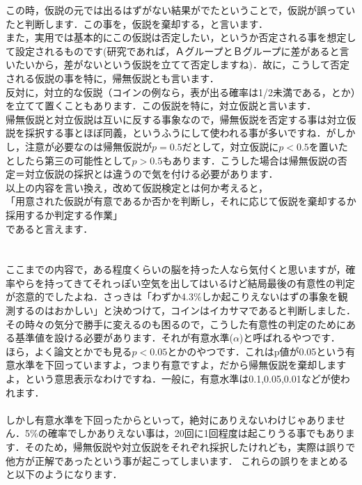 \documentclass[11pt,a4paper,uplatex]{ujreport} 	%
\begin{document}
この時，仮説の元では出るはずがない結果がでたということで，仮説が誤っていたと判断します．この事を，仮説を棄却する，と言います．\\

また，実用では基本的にこの仮説は否定したい，というか否定される事を想定して設定されるものです(研究であれば，ＡグループとＢグループに差があると言いたいから，差がないという仮説を立てて否定しますね)．故に，こうして否定される仮説の事を特に，帰無仮説とも言います．\\

反対に，対立的な仮説（コインの例なら，表が出る確率は1/2未満である，とか）を立てて置くこともあります．この仮説を特に，対立仮説と言います．\\

帰無仮説と対立仮説は互いに反する事象なので，帰無仮説を否定する事は対立仮説を採択する事とほぼ同義，というふうにして使われる事が多いですね．がしかし，注意が必要なのは帰無仮説が$p=0.5$だとして，対立仮説に$p<0.5$を置いたとしたら第三の可能性として$p>0.5$もあります．こうした場合は帰無仮説の否定＝対立仮説の採択とは違うので気を付ける必要があります．\\


以上の内容を言い換え，改めて仮説検定とは何か考えると，\\
「用意された仮説が有意であるか否かを判断し，それに応じて仮説を棄却するか採用するか判定する作業」\\
であると言えます．\\
\\
\\

ここまでの内容で，ある程度くらいの脳を持った人なら気付くと思いますが，確率やらを持ってきてそれっぽい空気を出してはいるけど結局最後の有意性の判定が恣意的でしたよね．さっきは「わずか4.3\%しか起こりえないはずの事象を観測するのはおかしい」と決めつけて，コインはイカサマであると判断しました．\\

その時々の気分で勝手に変えるのも困るので，こうした有意性の判定のためにある基準値を設ける必要があります．それが有意水準($\alpha$)と呼ばれるやつです．\\

ほら，よく論文とかでも見る$p<0.05$とかのやつです．これはp値が0.05という有意水準を下回っていますよ，つまり有意ですよ，だから帰無仮説を棄却しますよ，という意思表示なわけですね．一般に，有意水準は0.1,0.05,0.01などが使われます．\\
\\

しかし有意水準を下回ったからといって，絶対にありえないわけじゃありません．5\%の確率でしかありえない事は，20回に1回程度は起こりうる事でもあります．そのため，帰無仮説や対立仮説をそれぞれ採択したけれども，実際は誤りで他方が正解であったという事が起こってしまいます．
これらの誤りをまとめると以下のようになります．
\end{document}
